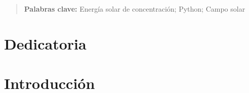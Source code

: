 \documentclass[12pt]{report} %
\begin{document}
	\newpage %
	\thispagestyle{empty}
	\mbox{}

\renewcommand\abstractname{\large\bfseries\filcenter\uppercase{Resumen}}
\begin{abstract}
\thispagestyle{plain}
\setcounter{page}{3}
	
	
	\textbf{Palabras clave:}
	Energía solar de concentración; Python; Campo solar
	
	\vfill
\end{abstract}
	\newpage %
	\thispagestyle{empty}
	\mbox{}


\chapter*{Dedicatoria}

\setcounter{page}{5}
		
	\vfill
	
	\newpage %
	\thispagestyle{empty}
	\mbox{}
	


\tableofcontents
\thispagestyle{fancy}

\newpage %
\thispagestyle{empty}
\mbox{}

\listoffigures
\thispagestyle{fancy}

\newpage %
\thispagestyle{empty}
\mbox{}

\listoftables
\thispagestyle{fancy}

\newpage %
\thispagestyle{empty}
\mbox{}


\clearpage
{} %

\chapter{Introducción}
\end{document}

